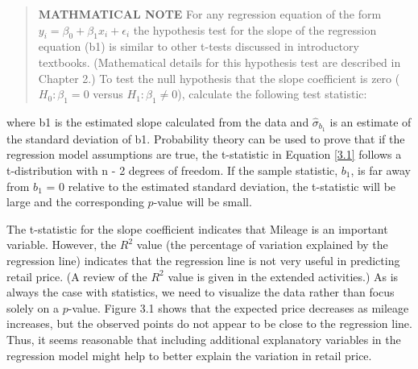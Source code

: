 \documentclass[
]{report}
\begin{document}
\begin{quote}
\textbf{MATHMATICAL NOTE} For any regression equation of the form \(y_i = \beta_0 + \beta_1x_i + \epsilon_i\) the hypothesis test for the slope of the regression equation (b1) is similar to other t-tests discussed in introductory textbooks. (Mathematical details for this hypothesis test are described in Chapter 2.) To test the null hypothesis that the slope coefficient is zero (\(H_0 : \beta_1 = 0\) versus \(H_1 : \beta_1 \ne 0\)), calculate the following test statistic:
\end{quote}

where b1 is the estimated slope calculated from the data and \(\hat{\sigma}_{b_1}\) is an estimate of the standard deviation of b1. Probability theory can be used to prove that if the regression model assumptions are true, the t-statistic in Equation \ref{3.1} follows a t-distribution with n - 2 degrees of freedom. If the sample statistic, \(b_1\), is far away from \(b_1\) = 0 relative to the estimated standard deviation, the t-statistic will be large and the corresponding \(p\)-value will be small.

The t-statistic for the slope coefficient indicates that Mileage is an important variable. However, the \(R^2\) value (the percentage of variation explained by the regression line) indicates that the regression line is not very useful in predicting retail price. (A review of the \(R^2\) value is given in the extended activities.) As is always the case with statistics, we need to visualize the data rather than focus solely on a \(p\)-value. Figure 3.1 shows that the expected price decreases as mileage increases, but the observed points do not appear to be close to the regression line. Thus, it seems reasonable that including additional explanatory variables in the regression model might help to better explain the variation in retail price.
\end{document}
